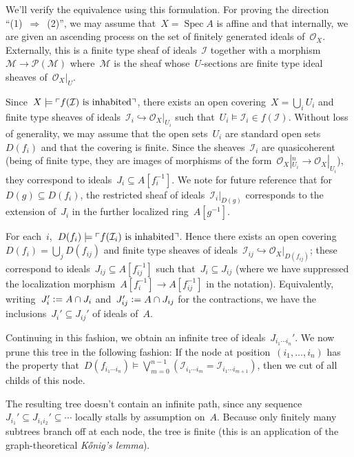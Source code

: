 \documentclass[10pt,reqno,a4paper]{amsbook}
\makeatletter
\theoremstyle{definition}
\theoremstyle{plain}
\theoremstyle{remark}
\let\acuteH\H
\newcommand{\konig}{K\acuteH onig}
\renewcommand{\H}{\mathcal{H}}
\renewcommand{\O}{\mathcal{O}}
\newcommand{\M}{\mathcal{M}}
\renewcommand{\P}{\mathcal{P}}
\newcommand{\I}{\mathcal{I}}
\DeclareMathOperator{\Spec}{Spec}
\newcommand{\?}{\,{:}\,}
\renewcommand{\_}{\mathpunct{.}\,}
\newcommand{\speak}[1]{\ulcorner\text{\textnormal{#1}}\urcorner}
\newcommand{\defeq}{\vcentcolon=}
\renewenvironment{proof}[1][\proofname]{\par
  \pushQED{\qed}%
  \normalfont \topsep6\p@\@plus6\p@\relax
  \trivlist
  \item[\hskip\labelsep
        \itshape
    #1\@addpunct{.}]\ignorespaces
}{%
  \popQED\endtrivlist\@endpefalse
}
\makeatother
\begin{document}
{\begin{proof}
We'll verify the equivalence using this formulation. For proving the
direction ``(1)~$\Rightarrow$~(2)'', we may assume that~$X =
\Spec A$ is affine and that internally, we are given an
ascending process on the set of finitely generated ideals of~$\O_X$.
Externally, this is a finite type sheaf of ideals~$\I$ together with a morphism~$\M
\to \P(\M)$ where~$\M$ is the sheaf whose~$U$-sections are finite type ideal
sheaves of~$\O_X|_U$.

Since~$X \models \speak{$f(\I)$ is inhabited}$, there exists an open covering~$X
= \bigcup_i U_i$ and finite type sheaves of ideals~$\I_i \hookrightarrow
\O_X|_{U_i}$ such that~$U_i \models \I_i \in f(\I)$. Without loss of generality,
we may assume that the open sets~$U_i$ are standard open sets~$D(f_i)$ and that
the covering is finite. Since the sheaves~$\I_i$ are quasicoherent (being of
finite type, they are images of morphisms of the form~$\O_X|_{U_i}^n \to
\O_X|_{U_i}$), they correspond to ideals~$J_i \subseteq A[f_i^{-1}]$. We note for future reference
that for~$D(g) \subseteq D(f_i)$, the restricted sheaf of ideals~$\I_i|_{D(g)}$
corresponds to the extension of~$J_i$ in the further
localized ring~$A[g^{-1}]$.

For each~$i$,~$D(f_i) \models \speak{$f(\I_i)$ is inhabited}$.
Hence there exists an open covering~$D(f_i) = \bigcup_j D(f_{ij})$ and finite
type sheaves of ideals~$\I_{ij} \hookrightarrow \O_X|_{D(f_{ij})}$; these
correspond to ideals~$J_{ij} \subseteq A[f_{ij}^{-1}]$ such that~$J_i
\subseteq J_{ij}$ (where we have suppressed the localization
morphism~$A[f_i^{-1}] \to A[f_{ij}^{-1}]$ in the notation). Equivalently,
writing~$J_i' \defeq A \cap J_i$ and~$J_{ij}' \defeq A \cap J_{ij}$ for the
contractions, we have the inclusions~$J_i' \subseteq J_{ij}'$ of ideals of~$A$.

Continuing in this fashion, we obtain an infinite tree of ideals~$J_{i_1 \cdots i_n}'$.
We now prune this tree in the following fashion: If the node at position~$(i_1,
\ldots, i_n)$ has the property that~$D(f_{i_1 \cdots i_n}) \models
\bigvee_{m=0}^{n-1} (\I_{i_1 \cdots i_m} = \I_{i_1 \cdots i_{m+1}})$, then we cut
of all childs of this node.

The resulting tree doesn't contain an infinite path, since any
sequence~$J_{i_1}' \subseteq J_{i_1 i_2}' \subseteq \cdots$ locally stalls by
assumption on~$A$. Because only finitely many subtrees branch off at each node,
the tree is finite (this is an application of the graph-theoretical
\emph{\konig's lemma}).


\end{proof}}
\end{document}
